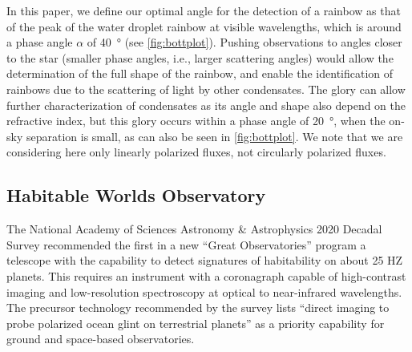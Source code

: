 \documentclass[usenatbib]{mnras}
\begin{document}
In this paper, we define our optimal angle for the detection of a rainbow as that of the peak of the water droplet rainbow at visible wavelengths, which is around a phase angle $\alpha$ of \qty{40}{\degree} (see \cref{fig:bottplot}).
%
Pushing observations to angles closer to the star (smaller phase angles, i.e., larger scattering angles) would allow the determination of the full shape of the rainbow, and enable the identification of rainbows due to the scattering of light by other condensates.
%
The glory can allow further characterization of condensates as its angle and shape also depend on the refractive index, but this glory occurs within a phase angle of \qty{20}{\degree}, when the on-sky separation is small, as can also be seen in \cref{fig:bottplot}. We note that we are considering here only linearly polarized fluxes, not circularly polarized fluxes. 

%

\subsection{Habitable Worlds Observatory}

The National Academy of Sciences Astronomy \& Astrophysics 2020 Decadal Survey \citep{decadal} recommended the first in a new \enquote{Great Observatories} program a telescope with the capability to detect signatures of habitability on about 25 HZ planets.
This requires an instrument with a coronagraph capable of high-contrast imaging and low-resolution spectroscopy at optical to near-infrared wavelengths. 
The precursor technology recommended by the survey lists \enquote{direct imaging to probe polarized ocean glint on terrestrial planets} as a priority capability \citep[Box E.1 in][]{decadal} for ground and space-based observatories.
\end{document}
